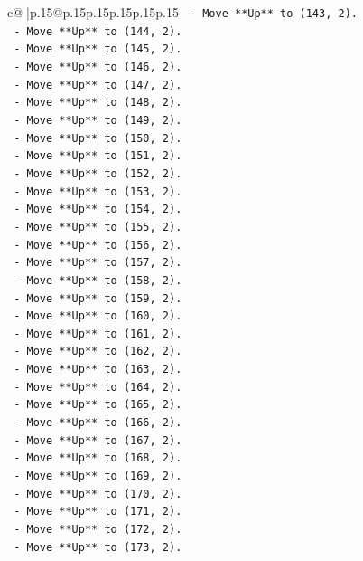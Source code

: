 \documentclass{article}
\begin{document}
{\begin{supertabular}{c@{$\;$}|p{.15\linewidth}@{}p{.15\linewidth}p{.15\linewidth}p{.15\linewidth}p{.15\linewidth}p{.15\linewidth}}
{{{\texttt{    {-} Move **Up** to (143, 2).} \\
\texttt{    {-} Move **Up** to (144, 2).} \\
\texttt{    {-} Move **Up** to (145, 2).} \\
\texttt{    {-} Move **Up** to (146, 2).} \\
\texttt{    {-} Move **Up** to (147, 2).} \\
\texttt{    {-} Move **Up** to (148, 2).} \\
\texttt{    {-} Move **Up** to (149, 2).} \\
\texttt{    {-} Move **Up** to (150, 2).} \\
\texttt{    {-} Move **Up** to (151, 2).} \\
\texttt{    {-} Move **Up** to (152, 2).} \\
\texttt{    {-} Move **Up** to (153, 2).} \\
\texttt{    {-} Move **Up** to (154, 2).} \\
\texttt{    {-} Move **Up** to (155, 2).} \\
\texttt{    {-} Move **Up** to (156, 2).} \\
\texttt{    {-} Move **Up** to (157, 2).} \\
\texttt{    {-} Move **Up** to (158, 2).} \\
\texttt{    {-} Move **Up** to (159, 2).} \\
\texttt{    {-} Move **Up** to (160, 2).} \\
\texttt{    {-} Move **Up** to (161, 2).} \\
\texttt{    {-} Move **Up** to (162, 2).} \\
\texttt{    {-} Move **Up** to (163, 2).} \\
\texttt{    {-} Move **Up** to (164, 2).} \\
\texttt{    {-} Move **Up** to (165, 2).} \\
\texttt{    {-} Move **Up** to (166, 2).} \\
\texttt{    {-} Move **Up** to (167, 2).} \\
\texttt{    {-} Move **Up** to (168, 2).} \\
\texttt{    {-} Move **Up** to (169, 2).} \\
\texttt{    {-} Move **Up** to (170, 2).} \\
\texttt{    {-} Move **Up** to (171, 2).} \\
\texttt{    {-} Move **Up** to (172, 2).} \\
\texttt{    {-} Move **Up** to (173, 2).} \\
}}}
\end{supertabular}}
\end{document}
